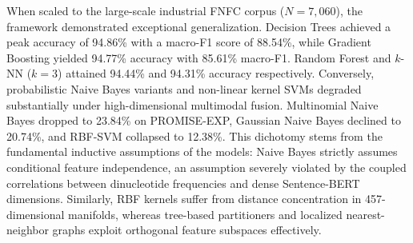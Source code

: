 \begin{table}[htbp]
\centering
\caption{Tri-corpus benchmark performance comparison across 12 supervised and ensemble algorithms evaluated on PROMISE~\cite{ref1}, PROMISE-EXP~\cite{ref2,ref3}, and industrial FNFC specifications.}
\label{tab:master_benchmark}
\small
{}
\end{table}

When scaled to the large-scale industrial FNFC corpus ($N=7,060$), the framework demonstrated exceptional generalization. Decision Trees achieved a peak accuracy of 94.86\% with a macro-F1 score of 88.54\%, while Gradient Boosting yielded 94.77\% accuracy with 85.61\% macro-F1. Random Forest and $k$-NN ($k=3$) attained 94.44\% and 94.31\% accuracy respectively. Conversely, probabilistic Naive Bayes variants and non-linear kernel SVMs degraded substantially under high-dimensional multimodal fusion. Multinomial Naive Bayes dropped to 23.84\% on PROMISE-EXP, Gaussian Naive Bayes declined to 20.74\%, and RBF-SVM collapsed to 12.38\%. This dichotomy stems from the fundamental inductive assumptions of the models: Naive Bayes strictly assumes conditional feature independence, an assumption severely violated by the coupled correlations between dinucleotide frequencies and dense Sentence-BERT dimensions. Similarly, RBF kernels suffer from distance concentration in 457-dimensional manifolds, whereas tree-based partitioners and localized nearest-neighbor graphs exploit orthogonal feature subspaces effectively.

